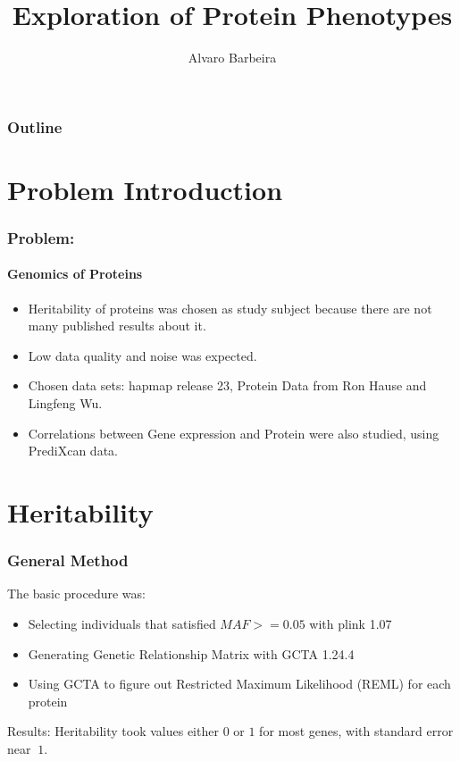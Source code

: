 \documentclass{beamer}
\title{Exploration of Protein Phenotypes}
\author{Alvaro Barbeira}
\begin{document}
  \begin{frame}
    \titlepage
  \end{frame}
  \begin{frame}
    \frametitle{Outline}
    \tableofcontents
  \end{frame}
  \section{Problem Introduction}
  \begin{frame}
    \frametitle{Problem:}
    \framesubtitle{Genomics of Proteins}
    \begin{itemize}
      \item
      Heritability of proteins was chosen as study subject because there are not many published results about it.
      \item
      Low data quality and noise was expected.
      \item
      Chosen data sets: hapmap release 23, Protein Data from Ron Hause and Lingfeng Wu.
      \item
      Correlations between Gene expression and Protein were also studied, using PrediXcan data.
    \end{itemize}
  \end{frame}
  
  \section{Heritability}
  
  \begin{frame}
    \frametitle{General Method}
    The basic procedure was:
    \begin{itemize}
      \item
      Selecting individuals that satisfied $MAF >= 0.05$ with plink 1.07
      \item
      Generating Genetic Relationship Matrix with GCTA 1.24.4
      \item
      Using GCTA to figure out Restricted Maximum Likelihood (REML) for each protein
    \end{itemize}
    \vskip15pt
    Results:
    Heritability took values either $0$ or $1$ for most genes, with standard error near $~1$.
  \end{frame}
  
\end{document}
